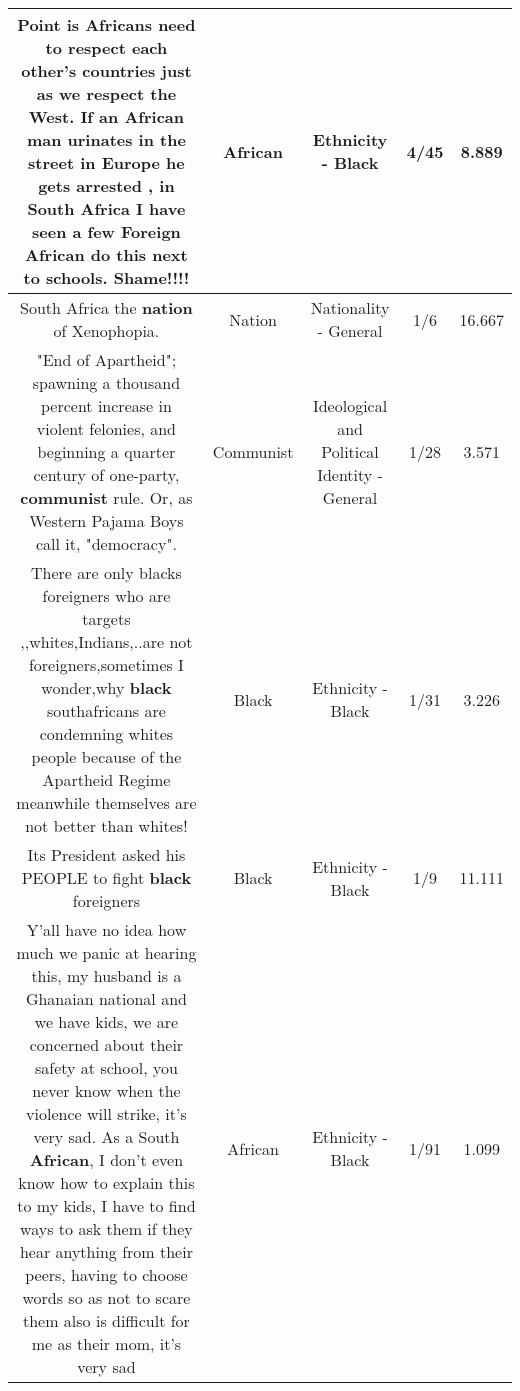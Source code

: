 \documentclass[11pt]{article}
\newlength\mylength
\begin{document}
\begin{center}
\begin{longtable}{|C{.65\mylength}|C{.30\mylength}|C{.12\mylength}|C{.12\mylength}|C{.12\mylength}|}
  \small Point is Africans need to respect each other's countries just as we respect the West. If an \textbf{African} man urinates in the street in Europe he gets arrested , in South Africa I have seen a few Foreign \textbf{African} do this next to schools. Shame!!!!\normalsize   & African & Ethnicity - Black & 4/45 & 8.889 \\  \hline
  \small South Africa the \textbf{nation} of Xenophopia.\normalsize   & Nation & Nationality - General & 1/6 & 16.667 \\  \hline
  \small "End of Apartheid"; spawning a thousand percent increase in violent felonies, and beginning a quarter century of one-party, \textbf{communist} rule. Or, as Western Pajama Boys call it, "democracy".\normalsize   & Communist &  Ideological and Political Identity - General & 1/28 & 3.571 \\  \hline
  \small There are only blacks foreigners who are targets ,,whites,Indians,..are not foreigners,sometimes I wonder,why \textbf{black} southafricans are condemning  whites people because of the Apartheid Regime meanwhile themselves are not better than whites!\normalsize   & Black & Ethnicity - Black & 1/31 & 3.226 \\  \hline
  \small Its President asked his PEOPLE to fight \textbf{black} foreigners\normalsize   & Black & Ethnicity - Black & 1/9 & 11.111 \\  \hline
  \small Y'all have no idea how much we panic at hearing this, my husband is a Ghanaian national and we have kids, we are concerned about their safety at school, you never know when the violence will strike, it's very sad. As a South \textbf{African}, I don't even know how to explain this to my kids, I have to find ways to ask them if they hear anything from their peers, having to choose words so as not to scare them also is difficult for me as their mom, it's very sad\normalsize   & African & Ethnicity - Black & 1/91 & 1.099 \\  \hline

\end{longtable}
\end{center}
\end{document}
